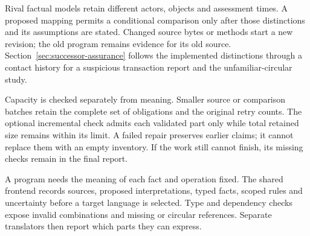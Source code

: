 \documentclass[12pt,a4paper,oneside,openany]{book}
\begin{document}
\begin{MapDiagram}
\end{MapDiagram}

Rival factual models retain different actors, objects and assessment times.
A proposed mapping permits a conditional comparison only after those
distinctions and its assumptions are stated. Changed source bytes or methods
start a new revision; the old program remains evidence for its old source.
Section~\ref{sec:successor-assurance} follows the implemented distinctions
through a contact history for a suspicious transaction report and the
unfamiliar-circular study.

Capacity is checked separately from meaning. Smaller source or comparison
batches retain the complete set of obligations and the original retry counts.
The optional incremental check admits each validated part only while total
retained size remains within its limit. A failed repair preserves earlier
claims; it cannot replace them with an empty inventory. If the work still
cannot finish, its missing checks remain in the final report.

\clearpage
{}
A program needs the meaning of each fact and operation fixed. The shared
frontend records sources, proposed interpretations, typed facts, scoped rules
and uncertainty before a target language is selected. Type and dependency
checks expose invalid combinations and missing or circular references.
Separate translators then report which parts they can express.
\end{document}
